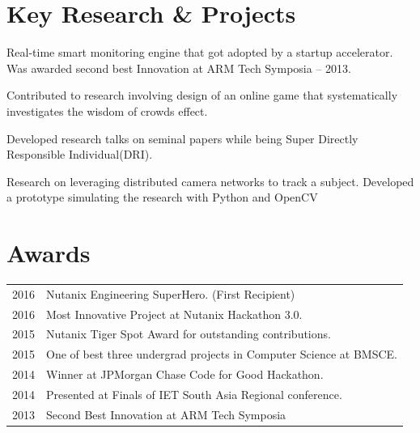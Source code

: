 \documentclass[]{deedy-resume-openfont}
\begin{document}
\begin{minipage}[t]{0.66\textwidth}
    
    \section{Key Research \& Projects}
    Real-time smart monitoring engine that got adopted by a startup accelerator. Was awarded second best Innovation at ARM Tech Symposia – 2013.
    \sectionsep
    
    Contributed to research involving design of an online game that systematically investigates the wisdom of crowds effect.
    \sectionsep
    
    Developed research talks on seminal papers while being Super Directly Responsible Individual(DRI).
    \sectionsep
    
    Research on leveraging distributed camera networks to track a subject. Developed a prototype simulating the research with Python and OpenCV
    \sectionsep
    

    \section{Awards} 
    \begin{tabular}{ll}
    2016	     & Nutanix Engineering SuperHero. (First Recipient)\\
    2016	     & Most Innovative Project at Nutanix Hackathon 3.0. \\
    2015	     & Nutanix Tiger Spot Award for outstanding contributions. \\
    2015         & One of best three undergrad projects in Computer Science at BMSCE. \\
    2014         & Winner at JPMorgan Chase Code for Good Hackathon. \\
    2014         & Presented at Finals of IET South Asia Regional conference. \\
    2013         & Second Best Innovation at ARM Tech Symposia
    \end{tabular}
    \sectionsep

    
    \end{minipage} 
    
\end{document}
